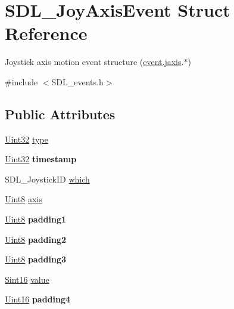 \hypertarget{structSDL__JoyAxisEvent}{}\section{S\+D\+L\+\_\+\+Joy\+Axis\+Event Struct Reference}
\label{structSDL__JoyAxisEvent}


Joystick axis motion event structure (\hyperlink{unionSDL__Event_ac4611acd0e9c675e67dc20919f0accb4}{event.\+jaxis}.$\ast$)  




{\ttfamily \#include $<$S\+D\+L\+\_\+events.\+h$>$}

\subsection*{Public Attributes}
\begin{DoxyCompactItemize}
\item 
\hyperlink{SDL__stdinc_8h_add440eff171ea5f55cb00c4a9ab8672d}{Uint32} \hyperlink{structSDL__JoyAxisEvent_aed1c873fb90ba58194e65f972933c67d}{type}
\item 
\hypertarget{structSDL__JoyAxisEvent_a60ecfc70df9eeef8e33b5dd7dc060389}{}\hyperlink{SDL__stdinc_8h_add440eff171ea5f55cb00c4a9ab8672d}{Uint32} {\bfseries timestamp}\label{structSDL__JoyAxisEvent_a60ecfc70df9eeef8e33b5dd7dc060389}

\item 
S\+D\+L\+\_\+\+Joystick\+I\+D \hyperlink{structSDL__JoyAxisEvent_a965719f4703a7091bcc5f07f79fcf7e1}{which}
\item 
\hyperlink{SDL__stdinc_8h_a2944638813a090aa23e62f4da842c3e2}{Uint8} \hyperlink{structSDL__JoyAxisEvent_a0beac2fb161e45771c424bd0b6daeabb}{axis}
\item 
\hypertarget{structSDL__JoyAxisEvent_ae8e17bced478530638982f0382a0dafa}{}\hyperlink{SDL__stdinc_8h_a2944638813a090aa23e62f4da842c3e2}{Uint8} {\bfseries padding1}\label{structSDL__JoyAxisEvent_ae8e17bced478530638982f0382a0dafa}

\item 
\hypertarget{structSDL__JoyAxisEvent_ad5407250032f618fde7437ac5f229257}{}\hyperlink{SDL__stdinc_8h_a2944638813a090aa23e62f4da842c3e2}{Uint8} {\bfseries padding2}\label{structSDL__JoyAxisEvent_ad5407250032f618fde7437ac5f229257}

\item 
\hypertarget{structSDL__JoyAxisEvent_a8bf5144fddc19686c2003add1f0e1565}{}\hyperlink{SDL__stdinc_8h_a2944638813a090aa23e62f4da842c3e2}{Uint8} {\bfseries padding3}\label{structSDL__JoyAxisEvent_a8bf5144fddc19686c2003add1f0e1565}

\item 
\hyperlink{SDL__stdinc_8h_a9d0257032c0e146ab6121bf0122712f5}{Sint16} \hyperlink{structSDL__JoyAxisEvent_a53ee73e7c367934dd6edb69963be5556}{value}
\item 
\hypertarget{structSDL__JoyAxisEvent_a604b258940a8cd8beaa5efeb55d6f825}{}\hyperlink{SDL__stdinc_8h_a31fcc0a076c9068668173ee26d33e42b}{Uint16} {\bfseries padding4}\label{structSDL__JoyAxisEvent_a604b258940a8cd8beaa5efeb55d6f825}

\end{DoxyCompactItemize}


